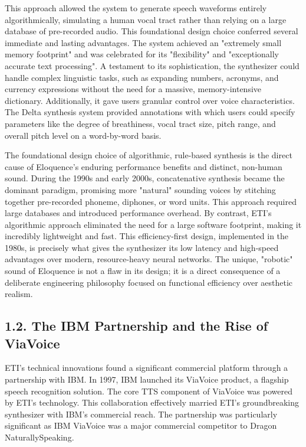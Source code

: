 This approach allowed the system to generate speech waveforms entirely
algorithmically, simulating a human vocal tract rather than relying on a
large database of pre-recorded audio.\supercite{3} This foundational design choice
conferred several immediate and lasting advantages. The system achieved
an "extremely small memory footprint" and was celebrated for its
"flexibility" and "exceptionally accurate text processing".\supercite{1} A
testament to its sophistication, the synthesizer could handle complex
linguistic tasks, such as expanding numbers, acronyms, and currency
expressions without the need for a massive, memory-intensive
dictionary.\supercite{3} Additionally, it gave users granular control over voice
characteristics. The Delta synthesis system provided annotations with
which users could specify parameters like the degree of breathiness,
vocal tract size, pitch range, and overall pitch level on a word-by-word
basis.\supercite{2}

The foundational design choice of algorithmic, rule-based synthesis is
the direct cause of Eloquence's enduring performance benefits and
distinct, non-human sound. During the 1990s and early 2000s,
concatenative synthesis became the dominant paradigm, promising more
"natural" sounding voices by stitching together pre-recorded phoneme,
diphones, or word units.\supercite{4} This approach required large databases and
introduced performance overhead. By contrast, ETI's algorithmic
approach eliminated the need for a large software footprint, making it
incredibly lightweight and fast.\supercite{6} This efficiency-first design,
implemented in the 1980s, is precisely what gives the synthesizer its
low latency and high-speed advantages over modern, resource-heavy neural
networks. The unique, "robotic" sound of Eloquence is not a flaw in
its design; it is a direct consequence of a deliberate engineering
philosophy focused on functional efficiency over aesthetic realism.

\subsection{1.2. The IBM Partnership and the Rise of ViaVoice}
ETI's technical innovations found a significant commercial platform
through a partnership with IBM. In 1997, IBM launched its ViaVoice
product, a flagship speech recognition solution.\supercite{7} The core TTS
component of ViaVoice was powered by ETI's technology. This
collaboration effectively married ETI's groundbreaking synthesizer with
IBM's commercial reach. The partnership was particularly significant as
IBM ViaVoice was a major commercial competitor to Dragon
NaturallySpeaking.\supercite{7}

